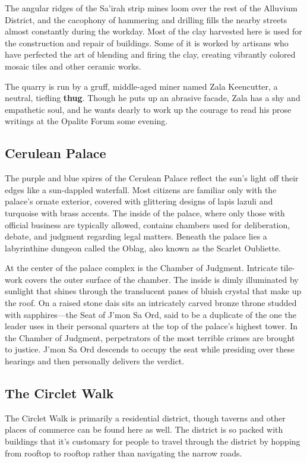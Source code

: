 \documentclass[a4paper, 11pt, bg=full, twocolumn, nooutline]{dndbook}
\begin{document}
The angular ridges of the Sa'irah strip mines loom over the rest of the Alluvium District, and the cacophony of hammering and drilling fills the nearby streets almost constantly during the workday. Most of the clay harvested here is used for the construction and repair of buildings. Some of it is worked by artisans who have perfected the art of blending and firing the clay, creating vibrantly colored mosaic tiles and other ceramic works.

The quarry is run by a gruff, middle-aged miner named Zala Keencutter, a neutral, tiefling \textbf{thug}. Though he puts up an abrasive facade, Zala has a shy and empathetic soul, and he wants dearly to work up the courage to read his prose writings at the Opalite Forum some evening.

\subsection{Cerulean Palace}

The purple and blue spires of the Cerulean Palace reflect the sun's light off their edges like a sun-dappled waterfall. Most citizens are familiar only with the palace's ornate exterior, covered with glittering designs of lapis lazuli and turquoise with brass accents. The inside of the palace, where only those with official business are typically allowed, contains chambers used for deliberation, debate, and judgment regarding legal matters. Beneath the palace lies a labyrinthine dungeon called the Oblag, also known as the Scarlet Oubliette.

At the center of the palace complex is the Chamber of Judgment. Intricate tile-work covers the outer surface of the chamber. The inside is dimly illuminated by sunlight that shines through the translucent panes of bluish crystal that make up the roof. On a raised stone dais sits an intricately carved bronze throne studded with sapphires---the Seat of J'mon Sa Ord, said to be a duplicate of the one the leader uses in their personal quarters at the top of the palace's highest tower. In the Chamber of Judgment, perpetrators of the most terrible crimes are brought to justice. J'mon Sa Ord descends to occupy the seat while presiding over these hearings and then personally delivers the verdict.

\subsection{The Circlet Walk}

The Circlet Walk is primarily a residential district, though taverns and other places of commerce can be found here as well. The district is so packed with buildings that it's customary for people to travel through the district by hopping from rooftop to rooftop rather than navigating the narrow roads.
\end{document}
